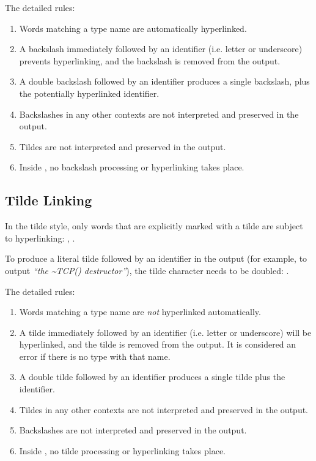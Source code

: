 The detailed rules:

\begin{enumerate}
  \item Words matching a type name are automatically hyperlinked.
  \item A backslash immediately followed by an identifier (i.e. letter or underscore)
        prevents hyperlinking, and the backslash is removed from the output.
  \item A double backslash followed by an identifier produces a single backslash,
        plus the potentially hyperlinked identifier.
  \item Backslashes in any other contexts are not interpreted and preserved in the output.
  \item Tildes are not interpreted and preserved in the output.
  \item Inside , no backslash processing or hyperlinking takes place.
\end{enumerate}

\subsection{Tilde Linking}
\label{sec:neddoc:tilde-linking}

In the tilde style, only words that are explicitly marked with a tilde are
subject to hyperlinking: ,
.

To produce a literal tilde followed by an identifier in the output (for example,
to output \textit{``the {\textasciitilde}TCP() destructor''}), the tilde character
needs to be doubled: .

The detailed rules:

\begin{enumerate}
  \item Words matching a type name are \textit{not} hyperlinked automatically.
  \item A tilde immediately followed by an identifier (i.e. letter or underscore)
        will be hyperlinked, and the tilde is removed from the output. It is
        considered an error if there is no type with that name.
  \item A double tilde followed by an identifier produces a single tilde plus the identifier.
  \item Tildes in any other contexts are not interpreted and preserved in the output.
  \item Backslashes are not interpreted and preserved in the output.
  \item Inside , no tilde processing or hyperlinking takes place.
\end{enumerate}

